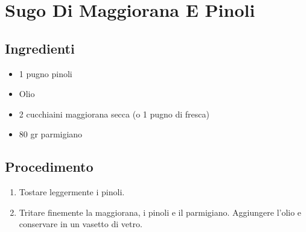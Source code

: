 \section{Sugo Di Maggiorana E Pinoli}
\subsection{Ingredienti}
\begin{itemize}
\item 1 pugno pinoli  
\item Olio  
\item 2 cucchiaini maggiorana secca (o 1 pugno di fresca)  
\item 80 gr parmigiano 
\end{itemize}
\subsection{Procedimento}
\begin{enumerate}
\item  Tostare leggermente i pinoli.  
\item  Tritare finemente la maggiorana, i pinoli e il parmigiano. Aggiungere l'olio e conservare in un vasetto di vetro.
\end{enumerate}
